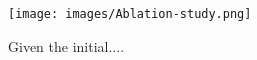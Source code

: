 \begin{figure}[t]
\centering
  \texttt{[image: images/Ablation-study.png]}
\caption{Given the initial....}
  \label{fig:Ablation-study}    
\end{figure}